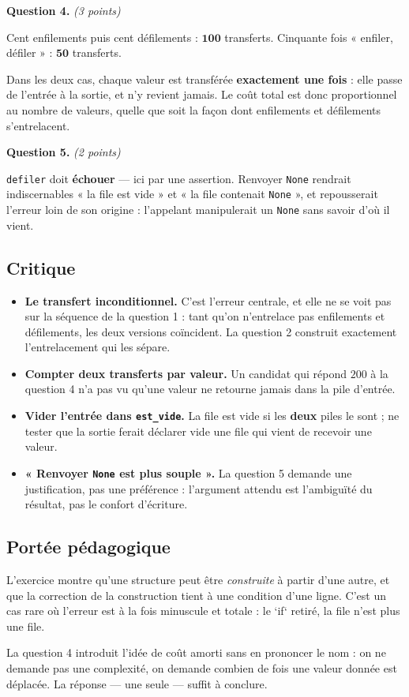 \medskip
\textbf{Question 4.} \emph{(3 points)}

Cent enfilements puis cent défilements : $\mathbf{100}$ transferts. Cinquante
fois « enfiler, défiler » : $\mathbf{50}$ transferts.

Dans les deux cas, chaque valeur est transférée \textbf{exactement une fois} :
elle passe de l'entrée à la sortie, et n'y revient jamais. Le coût total est
donc proportionnel au nombre de valeurs, quelle que soit la façon dont
enfilements et défilements s'entrelacent.

\medskip
\textbf{Question 5.} \emph{(2 points)}

\lstinline{defiler} doit \textbf{échouer} — ici par une assertion. Renvoyer
\lstinline{None} rendrait indiscernables « la file est vide » et « la file
contenait \lstinline{None} », et repousserait l'erreur loin de son origine :
l'appelant manipulerait un \lstinline{None} sans savoir d'où il vient.

\subsection*{Critique}

\begin{itemize}
  \item \textbf{Le transfert inconditionnel.} C'est l'erreur centrale, et elle
    ne se voit pas sur la séquence de la question 1 : tant qu'on n'entrelace pas
    enfilements et défilements, les deux versions coïncident. La question 2
    construit exactement l'entrelacement qui les sépare.
  \item \textbf{Compter deux transferts par valeur.} Un candidat qui répond
    $200$ à la question 4 n'a pas vu qu'une valeur ne retourne jamais dans la
    pile d'entrée.
  \item \textbf{Vider l'entrée dans \lstinline{est_vide}.} La file est vide si
    les \textbf{deux} piles le sont ; ne tester que la sortie ferait déclarer
    vide une file qui vient de recevoir une valeur.
  \item \textbf{« Renvoyer \lstinline{None} est plus souple ».} La question 5
    demande une justification, pas une préférence : l'argument attendu est
    l'ambiguïté du résultat, pas le confort d'écriture.
\end{itemize}

\subsection*{Portée pédagogique}

L'exercice montre qu'une structure peut être \emph{construite} à partir d'une
autre, et que la correction de la construction tient à une condition d'une
ligne. C'est un cas rare où l'erreur est à la fois minuscule et totale : le
`if` retiré, la file n'est plus une file.

La question 4 introduit l'idée de coût amorti sans en prononcer le nom : on ne
demande pas une complexité, on demande combien de fois une valeur donnée est
déplacée. La réponse — une seule — suffit à conclure.
